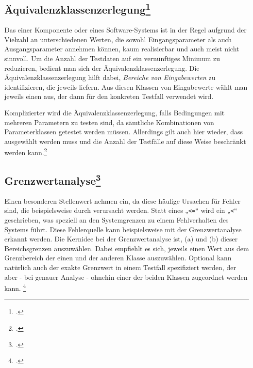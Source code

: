 \documentclass{bschlangaul-theorie}
\begin{document}
%

\subsection{Äquivalenzklassenzerlegung\footcite[Seite 250]{schneider}}

Das  einer Komponente oder eines
Software-Systems ist in der Regel aufgrund der Vielzahl an
unterschiedenen Werten, die sowohl Eingangsparameter als auch
Ausgangsparameter annehmen können, kaum realisierbar und auch meist
nicht sinnvoll. Um die Anzahl der Testdaten auf ein vernünftiges Minimum
zu reduzieren, bedient man sich der Äquivalenzklassenzerlegung. Die
Äquivalenzklassenzerlegung hilft dabei, \emph{Bereiche von
Eingabewerten} zu identifizieren, die jeweils  liefern. Aus diesen Klassen von Eingabewerte wählt man
jeweils einen  aus, der dann für den
konkreten Testfall verwendet wird.

Komplizierter wird die Äquivalenzklassenzerlegung, falls Bedingungen mit
mehreren Parametern zu testen sind, da sämtliche Kombinationen von
Parameterklassen getestet werden müssen. Allerdings gilt auch hier
wieder, dass  ausgewählt werden muss und die Anzahl der Testfälle auf
diese Weise beschränkt werden kann.\footcite[Seite 142]{schatten}

%

\subsection{Grenzwertanalyse\footcite[Seite 251]{schneider}}

Einen besonderen Stellenwert nehmen  ein, da diese häufige Ursachen für Fehler sind, die
beispielsweise durch  verursacht werden. Statt eines
„\texttt{<=}“ wird ein „\texttt{<}“ geschrieben, was speziell an den
Systemgrenzen zu einem Fehlverhalten des Systems führt. Diese
Fehlerquelle kann beispielsweise mit der Grenzwertanalyse erkannt
werden. Die Kernidee bei der Grenzwertanalyse ist, (a)
 und (b)  dieser Bereichsgrenzen auszuwählen. Dabei empfiehlt es
sich, jeweils einen Wert aus dem Grenzbereich der einen und der anderen
Klasse auszuwählen. Optional kann natürlich auch der exakte Grenzwert in
einem Testfall spezifiziert werden, der aber - bei genauer Analyse -
ohnehin einer der beiden Klassen zugeordnet werden kann.
\footcite[Seite 142]{schatten}
\end{document}
